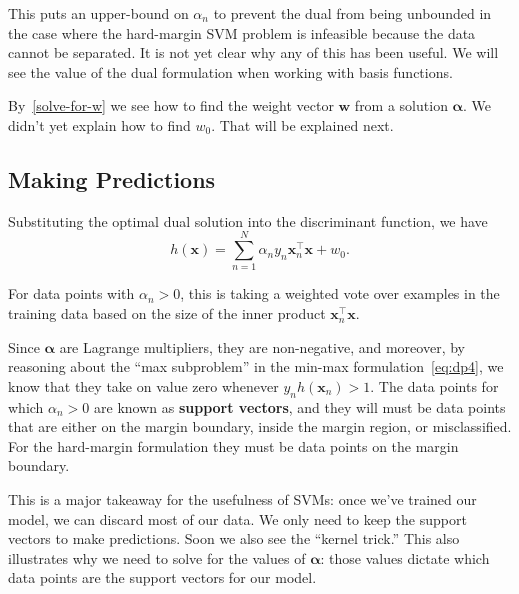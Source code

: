 This puts an upper-bound on $\alpha_n$ to prevent the dual from being unbounded in the case where the hard-margin SVM problem is infeasible because the data cannot be separated. 
It is not yet clear why any of this has been useful. We will see the value of the dual formulation when working with basis functions.
                                        
\begin{warning}
    By~\eqref{solve-for-w} we see how to find the weight vector $\mathbf{w}$ from a solution $\boldsymbol{\alpha}$. We didn't yet explain how to find $w_0$. That will be explained next.
\end{warning}
                                        
       

\subsection{Making Predictions}


Substituting the optimal dual solution into the discriminant function, we have
%
\begin{equation} \label{new-classification-fn}
	h(\textbf{x}) = \sum_{n=1}^{N} \alpha_{n} y_{n} \mathbf{x}_{n}^\top \mathbf{x} + w_{0}.
      \end{equation}

      For data points with $\alpha_n>0$, this is taking a weighted vote over examples in the training data based on the size of the inner product $\mathbf{x}^\top_n\mathbf{x}$.
      
Since $\boldsymbol{\alpha}$ are Lagrange multipliers, they are non-negative, and moreover, by reasoning about the ``max subproblem''
      in the min-max formulation~\eqref{eq:dp4}, we know that they take on value zero whenever $y_{n}
      h(\textbf{x}_{n}) > 1$.
%
%
      The data points for which $\alpha_{n} > 0$ are known as \textbf{support vectors}, and
they will  must be data points that are either  on the margin boundary, inside the margin region, or misclassified. For the hard-margin formulation they must be data points on the margin boundary.

This is a major takeaway for the usefulness of SVMs: once we've trained our model, we can discard most of our data. We only need to keep the support vectors to make predictions. Soon we also see the ``kernel trick.'' This also illustrates why we need to solve for the values of $\boldsymbol{\alpha}$: those values dictate which data points are the support vectors for our model.

